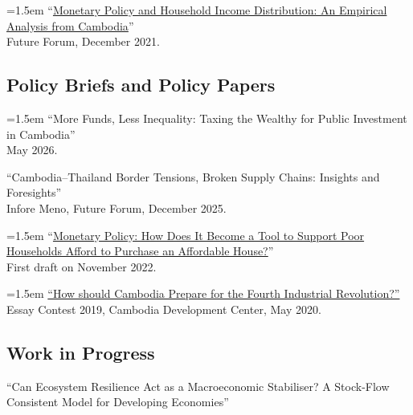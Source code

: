 \documentclass[10pt,a4paper]{article}
\begin{document}
	\hangindent=1.5em
	“\href{https://kosalnith.github.io/research/papers/MPHI.pdf}{Monetary Policy and Household Income Distribution: An Empirical Analysis from Cambodia}” \\
	Future Forum, December 2021. 

\subsection*{Policy Briefs and Policy Papers}
	
	\hangindent=1.5em
	``More Funds, Less Inequality: Taxing the Wealthy for Public Investment in Cambodia'' \\
	May 2026. \\ \vspace{-.5em}
	
	``Cambodia–Thailand Border Tensions, Broken Supply Chains: Insights and Foresights'' \\
		Infore Meno, Future Forum, December 2025. \\ \vspace{-.5em}
	
	
		\hangindent=1.5em
		“\href{}{Monetary Policy: How Does It Become a Tool to Support Poor Households Afford to Purchase an Affordable House?}” \\
		First draft on November 2022.  \\ \vspace{-.5em}
	
		\hangindent=1.5em
		\href{https://cd-center.org/en/essay-contest-2019-first-place-winner/}{``How should Cambodia Prepare for the Fourth Industrial Revolution?''} \\
		Essay Contest 2019, Cambodia Development Center, May 2020.

\subsection*{Work in Progress}
	

	
	``Can Ecosystem Resilience Act as a Macroeconomic Stabiliser?
	A Stock-Flow Consistent Model for Developing Economies''  \\ \vspace{-.5em}
	
\end{document}
